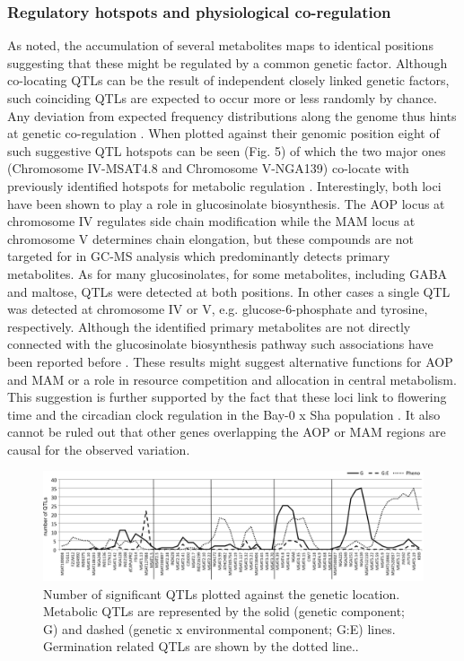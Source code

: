 \subsubsection{Regulatory hotspots and physiological co-regulation}
As noted, the accumulation of several metabolites maps to identical positions suggesting that these might 
be regulated by a common genetic factor. Although co-locating QTLs can be the result of independent closely 
linked genetic factors, such coinciding QTLs are expected to occur more or less randomly by chance. Any 
deviation from expected frequency distributions along the genome thus hints at genetic co-regulation 
\cite{Breitling:2008a}. When plotted against their genomic position eight of such suggestive QTL hotspots 
can be seen (Fig. 5) of which the two major ones (Chromosome IV-MSAT4.8 and Chromosome V-NGA139) co-locate 
with previously identified hotspots for metabolic regulation \cite{Kliebenstein:2001, Keurentjes:2006, 
Wentzell:2007, Rowe:2008}.  Interestingly, both loci have been shown to play a role in glucosinolate 
biosynthesis. The AOP locus at chromosome IV regulates side chain modification while the 
MAM locus at chromosome V determines chain elongation, but these compounds are not targeted for in GC-MS 
analysis which predominantly detects primary metabolites. As for many glucosinolates, for some metabolites, 
including GABA and maltose, QTLs were detected at both positions. In other cases a single QTL was detected 
at chromosome IV or V, e.g. glucose-6-phosphate and tyrosine, respectively. Although the identified  primary 
metabolites are not directly connected with the glucosinolate biosynthesis pathway such associations have 
been reported before \cite{Rowe:2008}. These results might suggest alternative functions for AOP and MAM 
or a role in resource competition and allocation in central metabolism. This suggestion is further supported 
by the fact that these loci link to flowering time and the circadian clock regulation in the Bay-0 x Sha 
population \cite{Chan:2011}. It also cannot be ruled out that other genes overlapping the AOP or MAM 
regions are causal for the observed variation.

\begin{figure}[h!]
  \centering
  \includegraphics[keepaspectratio,scale=0.30]{eps/image_3_2_5.eps}
  \caption[Number of significant QTL]{Number of significant QTLs plotted against the genetic location. Metabolic 
          QTLs are represented by the solid (genetic component; G) and dashed (genetic x environmental component; 
          G:E) lines. Germination related QTLs \cite{Joosen:2011} are shown by the dotted line..}
\end{figure}

